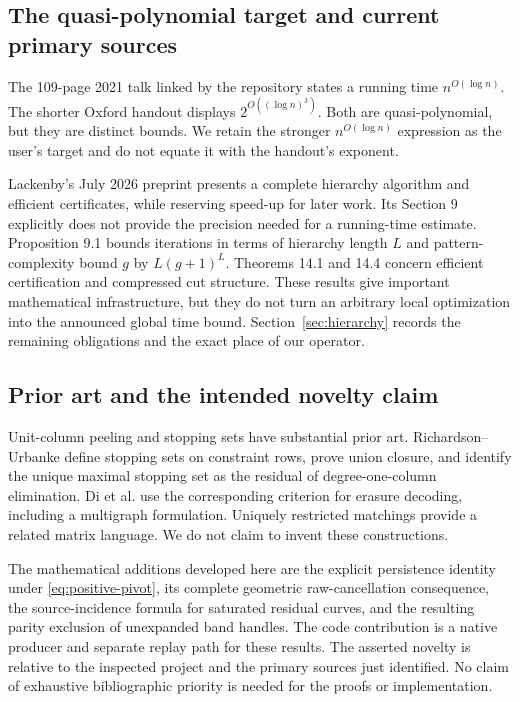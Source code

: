 \subsection{The quasi-polynomial target and current primary sources}

The 109-page 2021 talk linked by the repository states a running time
$n^{O(\log n)}$\cite{lackenby-talk}. The shorter Oxford handout displays
$2^{O((\log n)^3)}$\cite{lackenby-oxford}. Both are quasi-polynomial, but they
are distinct bounds. We retain the stronger $n^{O(\log n)}$ expression as
the user's target and do not equate it with the handout's exponent.

Lackenby's July 2026 preprint\cite{lackenby-2026} presents a complete
hierarchy algorithm and efficient certificates, while reserving speed-up
for later work. Its Section 9 explicitly does not provide the precision
needed for a running-time estimate. Proposition 9.1 bounds iterations in
terms of hierarchy length $L$ and pattern-complexity bound $g$ by
$L(g+1)^L$. Theorems 14.1 and 14.4 concern efficient certification and
compressed cut structure. These results give important mathematical
infrastructure, but they do not turn an arbitrary local optimization into
the announced global time bound. Section~\ref{sec:hierarchy} records the
remaining obligations and the exact place of our operator.

\subsection{Prior art and the intended novelty claim}

Unit-column peeling and stopping sets have substantial prior art.
Richardson--Urbanke\cite[Appendix C]{richardson-urbanke} define stopping
sets on constraint rows, prove union closure, and identify the unique
maximal stopping set as the residual of degree-one-column elimination.
Di et al.\cite[Definition 1.1 and Lemma 1.1]{di-et-al} use the corresponding
criterion for erasure decoding, including a multigraph formulation.
Uniquely restricted matchings provide a related matrix language\cite{urm}.
We do not claim to invent these constructions.

The mathematical additions developed here are the explicit persistence
identity under \eqref{eq:positive-pivot}, its complete geometric raw-cancellation
consequence, the source-incidence formula for saturated residual curves,
and the resulting parity exclusion of unexpanded band handles. The code
contribution is a native producer and separate replay path for these
results. The asserted novelty is relative to the inspected project and
the primary sources just identified. No claim of exhaustive bibliographic
priority is needed for the proofs or implementation.

